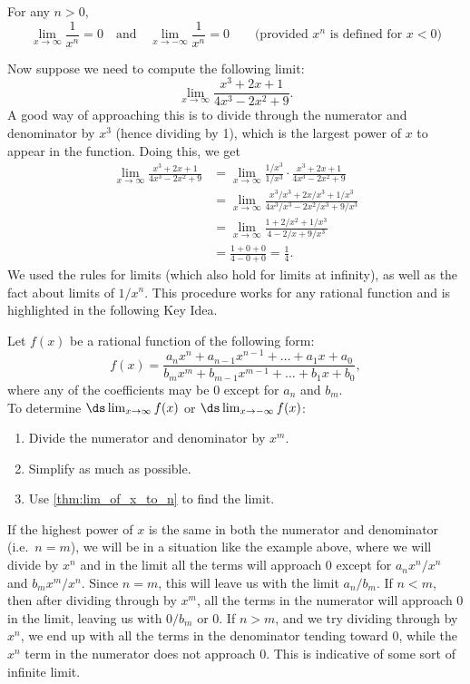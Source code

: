 {
\begin{theorem}\label{thm:lim_of_x_to_n}
For any $n>0$, 
\[
\lim_{x\to\infty}\frac{1}{x^n}=0
\quad\text{and}\quad
\lim_{x\to-\infty}\frac{1}{x^n}=0
\qquad\text{(provided $x^n$ is defined for $x<0$)}
\]
\end{theorem}}


Now suppose we need to compute the following limit:
\[\lim_{x\rightarrow\infty}\frac{x^3+2x+1}{4x^3-2x^2+9}.\]
A good way of approaching this is to divide through the numerator and denominator by $x^3$ (hence dividing by 1), which is the largest power of $x$ to appear in the function.  Doing this, we get
\begin{align*}
\lim_{x\to\infty}\frac{x^3+2x+1}{4x^3-2x^2+9} &=
\lim_{x\to\infty}\frac{1/x^3}{1/x^3}\cdot\frac{x^3+2x+1}{4x^3-2x^2+9}\\ &=\lim_{x\to\infty}\frac{x^3/x^3+2x/x^3+1/x^3}{4x^3/x^3-2x^2/x^3+9/x^3}\\ &= \lim_{x\to\infty}\frac{1+2/x^2+1/x^3}{4-2/x+9/x^3}\\
&=\frac{1+0+0}{4-0+0}=\frac14.
\end{align*}
We used the rules for limits (which also hold for limits at infinity), as well as the fact about limits of $1/x^n$. This procedure works for any rational function and is highlighted in the following Key Idea.

\begin{keyidea}\label{key:rat_lim_at_inf}
Let $f(x)$ be a rational function of the following form:
\[
f(x)
=\frac{a_nx^n + a_{n-1}x^{n-1}+\dots + a_1x + a_0}
{b_mx^m + b_{m-1}x^{m-1} + \dots + b_1x + b_0},
\]
where any of the coefficients may be 0 except for $a_n$ and $b_m$.\\
To determine $\ds\lim_{x\to \infty}f(x)$ or $\ds\lim_{x\to-\infty}f(x)$:
\begin{enumerate}
\item Divide the numerator and denominator by $x^m$.
\item Simplify as much as possible.
\item Use \autoref{thm:lim_of_x_to_n} to find the limit.
\end{enumerate}
\end{keyidea}

If the highest power of $x$ is the same in both the numerator and denominator (i.e.\ $n=m$), we will be in a situation like the example above, where we will divide by $x^n$ and in the limit all the terms will approach 0 except for $a_nx^n/x^n$ and $b_mx^m/x^n$. Since $n=m$, this will leave us with the limit $a_n/b_m$.  If $n<m$, then after dividing through by $x^m$, all the terms in the numerator will approach 0 in the limit, leaving us with $0/b_m$ or 0.  If $n>m$, and we try dividing through by $x^n$, we end up with all the terms in the denominator tending toward 0, while the $x^n$ term in the numerator does not approach 0.  This is indicative of some sort of infinite limit.

